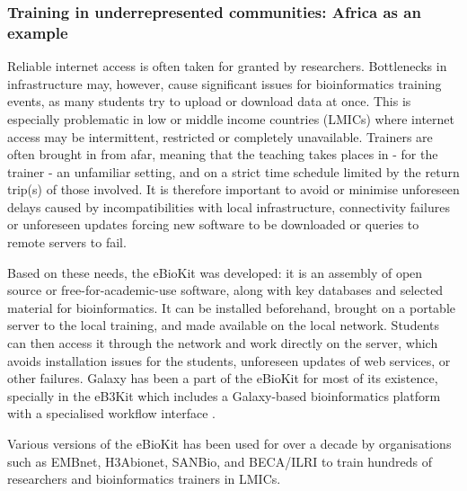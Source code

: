 \documentclass[10pt,letterpaper]{article}
\begin{document}
%

\subsubsection*{Training in underrepresented communities: Africa as an example}

Reliable internet access is often taken for granted by researchers. Bottlenecks in infrastructure may, however, cause significant issues for bioinformatics training events, as many students try to upload or download data at once. This is especially problematic in low or middle income countries (LMICs) where internet access may be intermittent, restricted or completely unavailable.
Trainers are often brought in from afar, meaning that the teaching takes places in - for the trainer - an unfamiliar setting, and on a strict time schedule limited by the return trip(s) of those involved. It is therefore important to avoid or minimise unforeseen delays caused by incompatibilities with local infrastructure, connectivity failures or unforeseen updates forcing new software to be downloaded or queries to remote servers to fail.


Based on these needs, the eBioKit \cite{Hernandez2017} was developed: it is an assembly of open source or free-for-academic-use software, along with key databases and selected material for bioinformatics. It can be installed beforehand, brought on a portable server to the local training, and made available on the local network. Students can then access it through the network and work directly on the server, which avoids installation issues for the students, unforeseen updates of web services, or other failures. Galaxy has been a part of the eBioKit for most of its existence, specially in the eB3Kit which includes a Galaxy-based bioinformatics platform with a specialised workflow interface \cite{Klingstrom_2017}. %

Various versions of the eBioKit has been used for over a decade by organisations such as EMBnet, H3Abionet, SANBio, and BECA/ILRI to train hundreds of researchers and bioinformatics trainers in LMICs.
\end{document}
